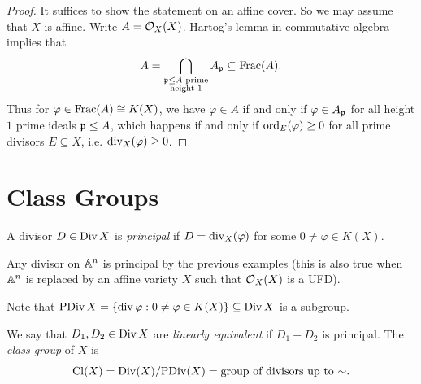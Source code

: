 \begin{proof}
  It suffices to show the statement on
  an affine cover. So we may assume that
  $X$ is affine. Write $A = \mathcal{O}_X(X)$.
  Hartog's lemma in commutative algebra
  implies that
  \[
    A = \bigcap_{\substack{\mathfrak{p} \le A \text{ prime} \\ \text{height $1$}}} A_{\mathfrak{p}}
    \subseteq \operatorname{Frac}(A).
  \]
  Thus for $\varphi \in \operatorname{Frac}(A) \cong K(X)$,
  we have
  $\varphi \in A$ if and only if
  $\varphi \in A_{\mathfrak{p}}$ for all height $1$
  prime ideals $\mathfrak{p} \le A$, which happens
  if and only if $\operatorname{ord}_E(\varphi) \ge 0$
  for all prime divisors $E \subseteq X$, i.e.
  $\operatorname{div}_X(\varphi) \ge 0$.
\end{proof}

\section{Class Groups}
\begin{definition}
  A divisor $D \in \operatorname{Div} X$ is \emph{principal}
  if $D = \operatorname{div}_X(\varphi)$ for some
  $0 \ne \varphi \in K(X)$.
\end{definition}

\begin{example}
  Any divisor on $\mathbb{A}^n$ is principal
  by the previous examples (this is
  also true when $\mathbb{A}^n$ is replaced
  by an affine variety $X$ such that
  $\mathcal{O}_X(X)$ is a UFD).
\end{example}

\begin{remark}
  Note that $\operatorname{PDiv} X = \{\operatorname{div} \varphi : 0 \ne \varphi \in K(X)\} \subseteq \operatorname{Div} X$
  is a subgroup.
\end{remark}

\begin{definition}
  We say that $D_1, D_2 \in \operatorname{Div} X$ are
  \emph{linearly equivalent} if
  $D_1 - D_2$ is principal. The
  \emph{class group} of $X$ is
  \[
    \operatorname{Cl}(X) = \operatorname{Div}(X) / {\operatorname{PDiv}(X)}
    = \text{group of divisors up to $\sim$}.
  \]
\end{definition}

